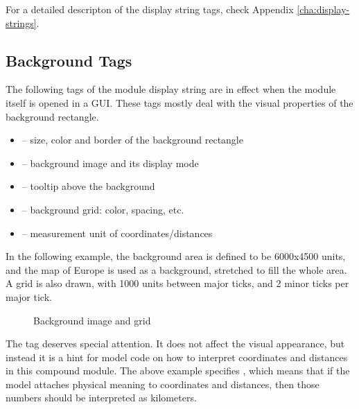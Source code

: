 For a detailed descripton of the display string tags, check
Appendix \ref{cha:display-strings}.


\subsection{Background Tags}
\label{sec:graphics:background-displaystring-tags}

The following tags of the module display string are in effect when the
module itself is opened in a GUI. These tags mostly deal with the visual
properties of the background rectangle.

\begin{itemize}
  \item {} -- size, color and border of the background rectangle
  \item {} -- background image and its display mode
  \item {} -- tooltip above the background
  \item {} -- background grid: color, spacing, etc.
  \item {} -- measurement unit of coordinates/distances
\end{itemize}

In the following example, the background area is defined to be 6000x4500
units, and the map of Europe is used as a background, stretched to fill the
whole area. A grid is also drawn, with 1000 units between major ticks,
and 2 minor ticks per major tick.

\begin{ned}
network EuropePlayground
{
    @display("bgb=6000,4500;bgi=maps/europe,s;bgg=1000,2,grey95;bgu=km");
\end{ned}

\begin{figure}[htbp]
  \begin{center}
    \caption{Background image and grid}
    \label{fig:graphics-bgtags}
  \end{center}
\end{figure}

The  tag deserves special attention. It does not affect
the visual appearance, but instead it is a hint for model code
on how to interpret coordinates and distances in this compound
module. The above example specifies , which means
that if the model attaches physical meaning to coordinates and
distances, then those numbers should be interpreted as kilometers.

